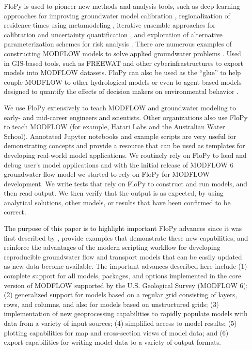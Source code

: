 \documentclass[11pt, oneside]{article}  	%
\begin{document}
FloPy is used to pioneer new methods and analysis tools, such as deep learning approaches for improving groundwater model calibration \citep{sun2018, zhou2021}, regionalization of residence times using metamodeling \citep{starn2018}, iterative ensemble approaches for calibration and uncertainty quantification \citep{white2018ies}, and exploration of alternative parameterization schemes for risk analysis \citep{knowling2019}. There are numerous examples of constructing MODFLOW models to solve applied groundwater problems \citep{befus2017, vanengelen2018, ebeling2019, zipper2019, befus2020}. Used in GIS-based tools, such as FREEWAT \citep{freewat2018} and other cyberinfrastructures \citep{essawy2018} to export models into MODFLOW datasets. FloPy can also be used as the ``glue'' to help couple MODFLOW to other hydrological models \citep{burek2020} or even to agent-based models designed to quantify the effects of decision makers on environmental behavior \citep{jaxarozen2019}. 

We use FloPy extensively to teach MODFLOW and groundwater modeling to early- and mid-career engineers and scientists. Other organizations also use FloPy to teach MODFLOW (for example, Hatari Labs and the Australian Water School). Annotated Jupyter notebooks and example scripts are very useful for demonstrating concepts and provide a resource that can be used as templates for developing real-world model applications. We routinely rely on FloPy to load and debug user's model applications and with the initial release of MODFLOW 6 groundwater flow model \citep{modflow6gwf} we started to rely on FloPy for MODFLOW development. We write tests that rely on FloPy to construct and run models, and then read output. We then verify that the output is as expected, by using analytical solutions, other models, or results that have been confirmed to be correct.

The purpose of this paper is to highlight important FloPy advances since it was first described by \cite{bakker2016scripting}, provide examples that demonstrate these new capabilities, and reinforce the advantages of the modern scripting workflow for developing reproducible groundwater flow and transport models that can be easily updated as new data become available. The important advances described here include (1) complete support for all models, packages, and options implemented in the core version of MODFLOW supported by the U.S. Geological Survey (MODFLOW 6); (2) generalized support for models based on a regular grid consisting of layers, rows, and columns, and also for models based on unstructured grids; (3) implementation of new geoprocessing capabilities to rapidly populate models with data from a variety of input sources; (4) simplified access to model results; (5) plotting capabilities for map and cross-section views of model data; and (6) export capabilities for writing model data to a variety of output formats.
\end{document}
